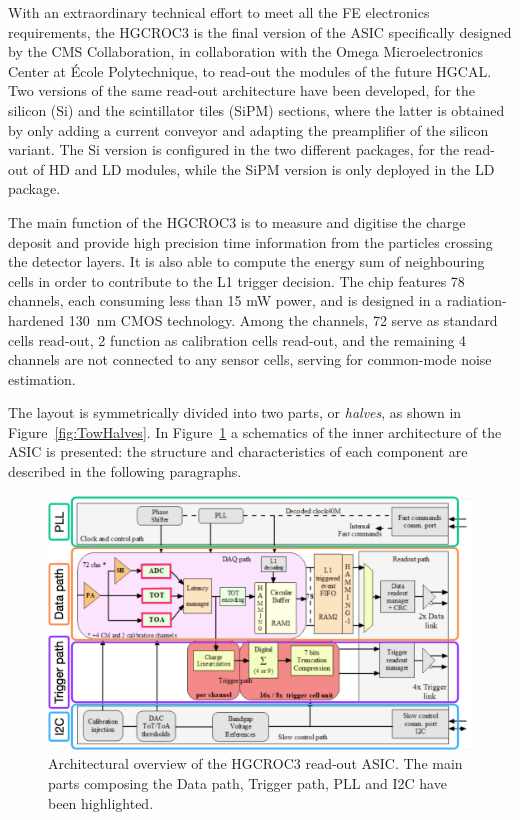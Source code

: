 With an extraordinary technical effort to meet all the FE electronics requirements, the HGCROC3 is the final version of the ASIC specifically designed by the CMS Collaboration, in collaboration with the Omega Microelectronics Center at École Polytechnique, to read-out the modules of the future HGCAL. 
Two versions of the same read-out architecture have been developed, for the silicon (Si) and the scintillator tiles (SiPM) sections, where the latter is obtained by only adding a current conveyor and adapting the preamplifier of the silicon variant. The Si version is configured in the two different packages, for the read-out of HD and LD modules, while the SiPM version is only deployed in the LD package.

\bigbreak

The main function of the HGCROC3 is to measure and digitise the charge deposit and provide high precision time information from the particles crossing the detector layers. It is also able to compute the energy sum of neighbouring cells in order to contribute to the L1 trigger decision. 
The chip features 78 channels, each consuming less than 15 mW power, and is designed in a radiation-hardened 130~nm CMOS technology. Among the channels, 72 serve as standard cells read-out, 2 function as calibration cells read-out, and the remaining 4 channels are not connected to any sensor cells, serving for common-mode noise estimation. 

The layout is symmetrically divided into two parts, or \textit{halves}, as shown in Figure~\ref{fig:TowHalves}.
In Figure~\ref{fig:Architecture} a schematics of the inner architecture of the ASIC is presented: the structure and characteristics of each component are described in the following paragraphs.

\begin{figure}
    \centering
    \includegraphics[width=0.75\linewidth]{Figures/HGCAL/Architecture.pdf}
    \caption{Architectural overview of the HGCROC3 read-out ASIC. The main parts composing the Data path, Trigger path, PLL and I2C have been highlighted.}
    \label{fig:Architecture}
\end{figure}

